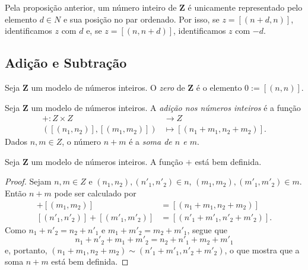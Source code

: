	Pela proposição anterior, um número inteiro de $\bm Z$ é unicamente representado pelo elemento $d \in N$ e sua posição no par ordenado. Por isso, se $z=[(n+d,n)]$, identificamos $z$ com $d$ e, se $z=[(n,n+d)]$, identificamos $z$ com $-d$.


\subsection{Adição e Subtração}

\begin{defi}
	Seja $\bm Z$ um modelo de números inteiros. O \emph{zero} de $\bm Z$ é o elemento $0 := [(n,n)]$.
\end{defi}

\begin{defi}
	Seja $\bm Z$ um modelo de números inteiros. A \emph{adição nos números inteiros} é a função
	\begin{align*}
	+: Z \times Z &\to Z \\
		([(n_1,n_2)],[(m_1,m_2)]) &\mapsto [(n_1+m_1,n_2+m_2)].
	\end{align*}
Dados $n,m \in Z$, o número $n+m$ é a \emph{soma de $n$ e $m$}.
\end{defi}

\begin{teo}
	Seja $\bm Z$ um modelo de números inteiros. A função $+$ está bem definida.
\end{teo}
\begin{proof}
	Sejam $n,m \in Z$ e $(n_1,n_2),(n'_1,n'_2) \in n$, $(m_1,m_2),(m'_1,m'_2) \in m$. Então $n+m$ pode ser calculado por
	\begin{align*}
	[(n_1,n_2)]+[(m_1,m_2)] &= [(n_1+m_1,n_2+m_2)] \\
	[(n'_1,n'_2)]+[(m'_1,m'_2)] &= [(n'_1+m'_1,n'_2+m'_2)].
	\end{align*}
Como $n_1+n'_2=n_2+n'_1$ e $m_1+m'_2=m_2+m'_1$, segue que
	\begin{equation*}
	n_1+n'_2+m_1+m'_2=n_2+n'_1+m_2+m'_1
	\end{equation*}
e, portanto, $(n_1+m_1,n_2+m_2) \sim (n'_1+m'_1,n'_2+m'_2)$, o que mostra que a soma $n+m$ está bem definida.
\end{proof}

